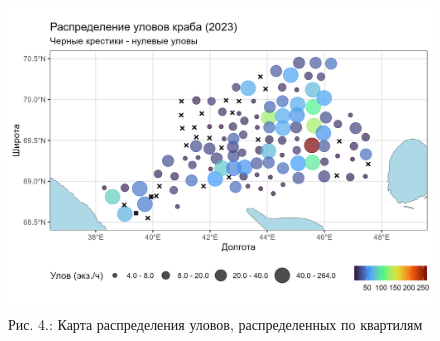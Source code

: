 \documentclass[
  letterpaper,
  DIV=11,
  numbers=noendperiod]{scrreprt}
\begin{document}
\begin{figure}[H]

{\centering \includegraphics[width=0.7\linewidth,height=\textheight,keepaspectratio]{images/KARTOGRAPH4.jpg}

}

\caption{Рис. 4.: Карта распределения уловов, распределенных по
квартилям}

\end{figure}%
\end{document}
